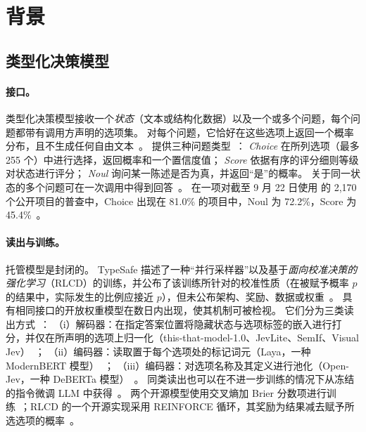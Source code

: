 \section{背景}
\label{sec:background}

\subsection{类型化决策模型}
\label{sec:tdm}

\paragraph{接口。}
类型化决策模型接收一个\emph{状态}（文本或结构化数据）以及一个或多个问题，每个问题都带有调用方声明的选项集。
对每个问题，它恰好在这些选项上返回一个概率分布，且不生成任何自由文本~\cite{arx23886,arx26758,arx32160}。
\jev{} 提供三种问题类型~\cite{typesafe_intro,arx32160}：
\emph{Choice} 在所列选项（最多 255 个）中进行选择，返回概率和一个置信度值；
\emph{Score} 依据有序的评分细则等级对状态进行评分；
\emph{Noul} 询问某一陈述是否为真，并返回“是”的概率。
关于同一状态的多个问题可在一次调用中得到回答~\cite{arx29429,arx28919}。
在一项对截至 9 月 22 日使用 \jev{} 的 2{,}170 个公开项目的普查中，Choice 出现在 81.0\% 的项目中，Noul 为 72.2\%，Score 为 45.4\%~\cite{arx30216}。

\paragraph{读出与训练。}
托管模型是封闭的。
TypeSafe 描述了一种“并行采样器”以及基于\emph{面向校准决策的强化学习}（RLCD）的训练，并公布了该训练所针对的校准性质（在被赋予概率 $p$ 的结果中，实际发生的比例应接近 $p$），但未公布架构、奖励、数据或权重~\cite{almeida2026introducing,typesafe_primer,arx24574,arx28919}。
具有相同接口的开放权重模型在数日内出现，使其机制可被检视。
它们分为三类读出方式~\cite{arx32160}：
（i）解码器：在指定答案位置将隐藏状态与选项标签的嵌入进行打分，并仅在所声明的选项上归一化（this-that-model-1.0、JevLite、SemIf、Visual Jev）~\cite{arx23886,arx23959,arx22753,arx25845}；
（ii）编码器：读取置于每个选项处的标记词元（Laya，一种 ModernBERT 模型）~\cite{arx26758}；
（iii）编码器：对选项名称及其定义进行池化（Open-Jev，一种 DeBERTa 模型）~\cite{arx26758}。
同类读出也可以在不进一步训练的情况下从冻结的指令微调 LLM 中获得~\cite{arx00831,arx02076}。
两个开源模型使用交叉熵加 Brier 分数项进行训练~\cite{arx23886,arx23959}；RLCD 的一个开源实现采用 REINFORCE 循环，其奖励为结果减去赋予所选选项的概率~\cite{arx24574}。

